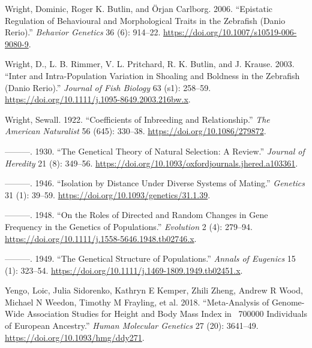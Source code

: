 \documentclass[
]{book}
\newlength{\cslhangindent}
\newlength{\cslentryspacingunit} %
\newenvironment{CSLReferences}[2] %
 {%
  \setlength{\parindent}{0pt}
  \ifodd #1
  \let\oldpar\par
  \def\par{\hangindent=\cslhangindent\oldpar}
  \fi
  \setlength{\parskip}{#2\cslentryspacingunit}
 }%
 {}
\begin{document}
\begin{CSLReferences}{1}{0}
\leavevmode{}%
Wright, Dominic, Roger K. Butlin, and Örjan Carlborg. 2006. {``Epistatic Regulation of Behavioural and Morphological Traits in the Zebrafish ({Danio} Rerio).''} \emph{Behavior Genetics} 36 (6): 914--22. \url{https://doi.org/10.1007/s10519-006-9080-9}.

\leavevmode{}%
Wright, D., L. B. Rimmer, V. L. Pritchard, R. K. Butlin, and J. Krause. 2003. {``Inter and Intra-Population Variation in Shoaling and Boldness in the Zebrafish ({Danio} Rerio).''} \emph{Journal of Fish Biology} 63 (s1): 258--59. \url{https://doi.org/10.1111/j.1095-8649.2003.216bw.x}.

\leavevmode{}%
Wright, Sewall. 1922. {``Coefficients of {Inbreeding} and {Relationship}.''} \emph{The American Naturalist} 56 (645): 330--38. \url{https://doi.org/10.1086/279872}.

\leavevmode{}%
---------. 1930. {``The {Genetical Theory} of {Natural Selection}: {A Review}.''} \emph{Journal of Heredity} 21 (8): 349--56. \url{https://doi.org/10.1093/oxfordjournals.jhered.a103361}.

\leavevmode{}%
---------. 1946. {``Isolation by {Distance} Under {Diverse Systems} of {Mating}.''} \emph{Genetics} 31 (1): 39--59. \url{https://doi.org/10.1093/genetics/31.1.39}.

\leavevmode{}%
---------. 1948. {``On the {Roles} of {Directed} and {Random Changes} in {Gene Frequency} in the {Genetics} of {Populations}.''} \emph{Evolution} 2 (4): 279--94. \url{https://doi.org/10.1111/j.1558-5646.1948.tb02746.x}.

\leavevmode{}%
---------. 1949. {``The {Genetical Structure} of {Populations}.''} \emph{Annals of Eugenics} 15 (1): 323--54. \url{https://doi.org/10.1111/j.1469-1809.1949.tb02451.x}.

\leavevmode{}%
Yengo, Loic, Julia Sidorenko, Kathryn E Kemper, Zhili Zheng, Andrew R Wood, Michael N Weedon, Timothy M Frayling, et al. 2018. {``Meta-Analysis of Genome-Wide Association Studies for Height and Body Mass Index in ~700000 Individuals of {European} Ancestry.''} \emph{Human Molecular Genetics} 27 (20): 3641--49. \url{https://doi.org/10.1093/hmg/ddy271}.


\end{CSLReferences}
\end{document}
